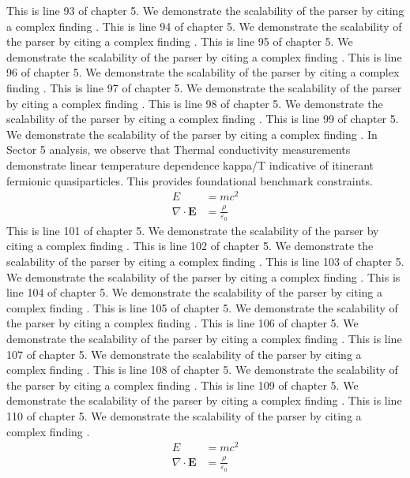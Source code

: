 This is line 93 of chapter 5. We demonstrate the scalability of the parser by citing a complex finding \cite{ref5_93}.
This is line 94 of chapter 5. We demonstrate the scalability of the parser by citing a complex finding \cite{ref5_94}.
This is line 95 of chapter 5. We demonstrate the scalability of the parser by citing a complex finding \cite{ref5_95}.
This is line 96 of chapter 5. We demonstrate the scalability of the parser by citing a complex finding \cite{ref5_96}.
This is line 97 of chapter 5. We demonstrate the scalability of the parser by citing a complex finding \cite{ref5_97}.
This is line 98 of chapter 5. We demonstrate the scalability of the parser by citing a complex finding \cite{ref5_98}.
This is line 99 of chapter 5. We demonstrate the scalability of the parser by citing a complex finding \cite{ref5_99}.
In Sector 5 analysis, we observe that Thermal conductivity measurements demonstrate linear temperature dependence kappa/T indicative of itinerant fermionic quasiparticles. This provides foundational benchmark constraints.
\begin{align*}
  E &= mc^2 \\
  \nabla \cdot \mathbf{E} &= \frac{\rho}{\varepsilon_0}
\end{align*}
This is line 101 of chapter 5. We demonstrate the scalability of the parser by citing a complex finding \cite{ref5_101}.
This is line 102 of chapter 5. We demonstrate the scalability of the parser by citing a complex finding \cite{ref5_102}.
This is line 103 of chapter 5. We demonstrate the scalability of the parser by citing a complex finding \cite{ref5_103}.
This is line 104 of chapter 5. We demonstrate the scalability of the parser by citing a complex finding \cite{ref5_104}.
This is line 105 of chapter 5. We demonstrate the scalability of the parser by citing a complex finding \cite{ref5_105}.
This is line 106 of chapter 5. We demonstrate the scalability of the parser by citing a complex finding \cite{ref5_106}.
This is line 107 of chapter 5. We demonstrate the scalability of the parser by citing a complex finding \cite{ref5_107}.
This is line 108 of chapter 5. We demonstrate the scalability of the parser by citing a complex finding \cite{ref5_108}.
This is line 109 of chapter 5. We demonstrate the scalability of the parser by citing a complex finding \cite{ref5_109}.
This is line 110 of chapter 5. We demonstrate the scalability of the parser by citing a complex finding \cite{ref5_110}.
\begin{align*}
  E &= mc^2 \\
  \nabla \cdot \mathbf{E} &= \frac{\rho}{\varepsilon_0}
\end{align*}
